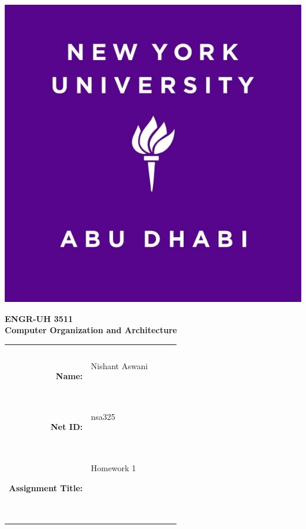 \documentclass[11pt]{exam}
\newcommand{\myname}{Nishant Aswani}
\newcommand{\mynetid}{nsa325}
\newcommand{\myhwtype}{Homework}
\newcommand{\myhwnum}{1}
\newcommand{\mycoursenumber}{ENGR-UH 3511}
\newcommand{\myclassname}{Computer Organization and Architecture}
\begin{document}
\begin{center}
  \includegraphics[scale=0.15]{etc/NYUAD-alt-logo.jpg}
\end{center}

{\vspace{1.5em}}

\begin{center}
    \Huge{\textbf{\mycoursenumber}}\\
    {\vspace{0.5em}}
    \Huge{\textbf{\myclassname}}
\end{center}

{\vspace{10em}}

\begin{center}
  \begin{tabular}{|rp{5.0cm}lll|}
    \hline
    &  &  &  & \\
    &  &  &  & \\
    \Large{\textbf{Name:}} & \Large{\myname}
    
    \  &  &  & \\
    \Large{\textbf{Net ID:}} & \Large{\mynetid}
    
    \  &  &  & \\
    \Large{\textbf{Assignment Title:}} & \Large{\myhwtype{} \myhwnum}
    
    \
    
    \  &  &  & \\
    \hline
  \end{tabular}
\end{center}
\end{document}
